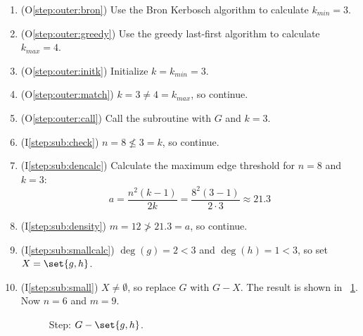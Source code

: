 \begin{enumerate}
\item (O\ref{step:outer:bron}) Use the Bron Kerbosch algorithm to calculate \(k_{min}=3\).

\item (O\ref{step:outer:greedy}) Use the greedy last-first algorithm to calculate \(k_{max}=4\).

\item (O\ref{step:outer:initk}) Initialize \(k=k_{min}=3\).

\item (O\ref{step:outer:match}) \(k=3\ne4=k_{max}\), so continue.

\item (O\ref{step:outer:call}) Call the subroutine with \(G\) and \(k=3\).

\item (I\ref{step:sub:check}) \(n=8\nleq3=k\), so continue.

\item (I\ref{step:sub:dencalc}) Calculate the maximum edge threshold for \(n=8\) and \(k=3\):
  \[a=\frac{n^2(k-1)}{2k}=\frac{8^2(3-1)}{2\cdot3}\approx21.3\]

\item (I\ref{step:sub:density}) \(m=12\ngtr21.3=a\), so continue.

\item (I\ref{step:sub:smallcalc}) \(\deg(g)=2<3\) and \(\deg(h)=1<3\), so set \(X=\set{g,h}\).

\item (I\ref{step:sub:small}) \(X\ne\emptyset\), so replace \(G\) with \(G-X\).  The result is shown in
  \figurename~\ref{fig:removegh}.  Now \(n=6\) and \(m=9\).

  \begin{figure}[H]
    \centering
    \caption{Step: \(G-\set{g,h}\).}
    \label{fig:removegh}
  \end{figure}


\end{enumerate}
